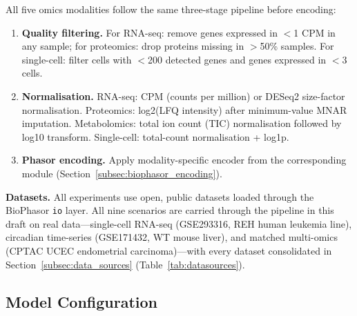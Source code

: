 \documentclass[preprint,12pt,amsmath,amssymb,superscriptaddress,floatfix]{revtex4-2}
\begin{document}
All five omics modalities follow the same three-stage pipeline before encoding:

\begin{enumerate}
    \item \textbf{Quality filtering.}
    For RNA-seq: remove genes expressed in $<$1 CPM in any sample;
    for proteomics: drop proteins missing in $>$50\% samples.
    For single-cell: filter cells with $<$200 detected genes and
    genes expressed in $<$3 cells.

    \item \textbf{Normalisation.}
    RNA-seq: CPM (counts per million) or DESeq2 size-factor normalisation.
    Proteomics: log2(LFQ intensity) after minimum-value MNAR imputation.
    Metabolomics: total ion count (TIC) normalisation followed by log10 transform.
    Single-cell: total-count normalisation + log1p.

    \item \textbf{Phasor encoding.}
    Apply modality-specific encoder from the corresponding module
    (Section~\ref{subsec:biophasor_encoding}).
\end{enumerate}

\textbf{Datasets.} All experiments use open, public datasets loaded through
the BioPhasor \texttt{io} layer. All nine scenarios are carried through the
pipeline in this draft on real data---single-cell RNA-seq (GSE293316, REH
human leukemia line), circadian time-series (GSE171432, WT mouse liver), and
matched multi-omics (CPTAC UCEC endometrial carcinoma)---with every dataset
consolidated in Section~\ref{subsec:data_sources}
(Table~\ref{tab:datasources}).

\subsection{Model Configuration}
\label{subsec:config}
\end{document}

